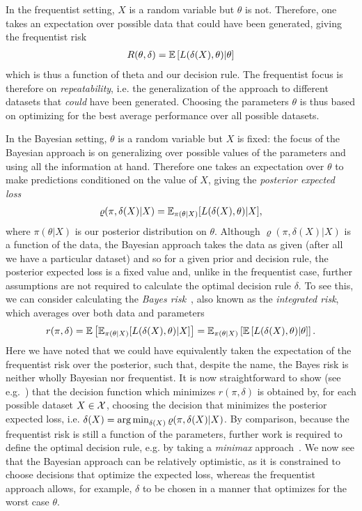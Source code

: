 In the
frequentist setting, $X$ is a random variable but $\theta$ is not.  Therefore, one takes an expectation over possible data
that could have been generated, giving the frequentist risk~\citep{vapnik1998statistical}
\begin{align}
\label{eq:bayes:freq-risk}
R(\theta,\delta)  = \mathbb{E}\left[L(\delta(X),\theta) | \theta \right]
\end{align}
which is thus a function of theta and our decision rule.
The frequentist focus is therefore on \emph{repeatability}, i.e.
the generalization of the approach to different datasets that \emph{could} have been generated.
Choosing the parameters $\theta$ is thus based on optimizing for the best average performance over all possible datasets.

In the Bayesian setting, $\theta$ is a random variable but $X$ is fixed: the focus of the Bayesian approach 
is on generalizing over possible values of
the parameters and using all the information at hand.  Therefore one takes an expectation over $\theta$
to make predictions conditioned on the value of $X$, giving the \emph{posterior expected loss}~\citep{robert2007bayesian}
\begin{align}
\label{eq:bayes:bayes-est}
\varrho(\pi,\delta(X) | X) = \mathbb{E}_{\pi(\theta | X)} [L(\delta(X),\theta) | X],
\end{align}
where $\pi(\theta | X)$ is our posterior distribution on $\theta$.  Although $\varrho(\pi,\delta(X) | X)$ 
is a function of the data, the Bayesian
approach takes the data as given (after all we have a particular dataset) and so for a given prior and decision rule, the posterior
expected loss is a fixed value and, unlike in the frequentist case, further assumptions are not required to
calculate the optimal decision rule $\delta$.  To see this, we can consider calculating the 
\emph{Bayes risk}~\citep{robert2007bayesian}, 
also known as the \emph{integrated risk}, which averages over both data and parameters
\begin{align}
	\label{eq:bayes:bayes-risk}
r(\pi,\delta) = \mathbb{E} \left[\mathbb{E}_{\pi(\theta | X)} [L(\delta(X),\theta) | X]\right] = 
\mathbb{E}_{\pi(\theta | X)} \left[\mathbb{E}\left[L(\delta(X),\theta) | \theta \right] \right].
\end{align}
Here we have noted that we could have equivalently taken the expectation of the frequentist
risk over the posterior, such that, despite the name, the Bayes risk is neither wholly Bayesian
nor frequentist.  It is now straightforward to show (see e.g.~\citep{robert2007bayesian}) that the
decision function which minimizes $r(\pi,\delta)$ is obtained by, for each possible dataset $X\in\mathcal{X}$,
choosing the decision that minimizes the posterior expected loss, i.e. $\delta(X) = \operatorname*{arg\,min}_{\delta(X)} \varrho(\pi,\delta(X) | X)$.
By comparison, because the frequentist risk is still a function of the parameters,
 further work is required to define the optimal decision rule, e.g. by taking a \emph{minimax}
approach~\citep{vapnik1998statistical}.
We now see that the Bayesian approach can be relatively optimistic, as it is constrained to choose
decisions that optimize the expected loss,
whereas the frequentist approach allows, for example, $\delta$ to be chosen in a manner that
optimizes for the worst case $\theta$.

